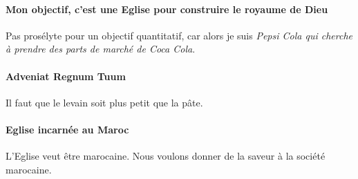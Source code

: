 \paragraph{Mon objectif, c'est une Eglise pour construire le royaume de Dieu} Pas prosélyte pour un objectif quantitatif, car alors je suis \textit{Pepsi Cola qui cherche à prendre des parts de marché de Coca Cola}.

\paragraph{Adveniat Regnum Tuum} Il faut que le levain soit plus petit que la pâte. 

\paragraph{Eglise incarnée au Maroc} L'Eglise veut être marocaine. Nous voulons donner de la saveur à la société marocaine. 


